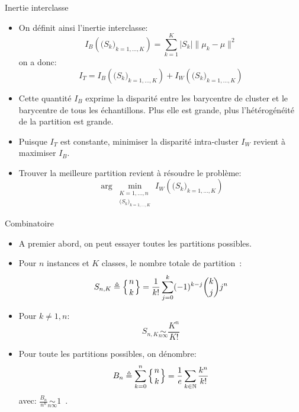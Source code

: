 \documentclass[8pt]{beamer}
\begin{document}
			\begin{frame}{Inertie interclasse}
				\begin{itemize}
					\item<1-> On définit ainsi l'inertie interclasse:
						\begin{equation}
							I_B(\big(S_k\big)_{k = 1, \dots, K}) = \sum_{k= 1}^{K} \vert S_k \vert \lVert \mu_k - \mu \rVert^2
						\end{equation}
						on a donc:
						\begin{equation}
							I_T = I_B(\big(S_k\big)_{k = 1, \dots, K}) + I_W(\big(S_k\big)_{k = 1, \dots, K})
						\end{equation}
					\item<2-> Cette quantité \(I_B\) exprime la disparité entre les barycentre de cluster et le barycentre de tous les échantillons. Plus elle est grande, plus l'hétérogénéité de la partition est grande.
					\item<3-> Puisque \(I_T\) est constante, minimiser la disparité intra-cluster \(I_W\) revient à maximiser \(I_B\).
					\item<4-> Trouver la meilleure partition revient à résoudre le problème:
						\begin{equation}
							\arg \min_{\substack{K = 1,\dots,n \\ \big(S_k\big)_{k = 1, \dots, K}}} I_W(\big(S_k\big)_{k = 1, \dots, K})
						\end{equation}
				\end{itemize}
			\end{frame}

			\begin{frame}{Combinatoire}
				\begin{itemize}
					\item<1-> A premier abord, on peut essayer toutes les partitions possibles.
					\item<2-> Pour \(n\) instances et \(K\) classes, le nombre totale de partition~\cite{StirlingWiki}:
						\begin{equation}
							S_{n,K} \triangleq \left\{ {n \atop k}\right\} = \frac{1}{k!}\sum_{j=0}^{k} (-1)^{k-j} \binom{k}{j} j^n
						\end{equation}
					\item<3-> Pour \(k \neq 1, n\):
						\begin{equation}
							S_{n,K} \underset{n\infty}{\sim} \frac{K^n}{K!}
						\end{equation}
					\item<4-> Pour toute les partitions possibles, on dénombre:
						\begin{equation}
							B_n \triangleq \sum_{k=0}^n \left\{ {n \atop k}\right\} = \frac{1}{e}\sum_{k\in\mathbb{N}} \frac{k^n}{k!}
						\end{equation}
						avec: \(\frac{B_n}{n^n} \underset{n\infty}{\sim} 1\)~\cite{BellWiki}.
				\end{itemize}
			\end{frame}
\end{document}

